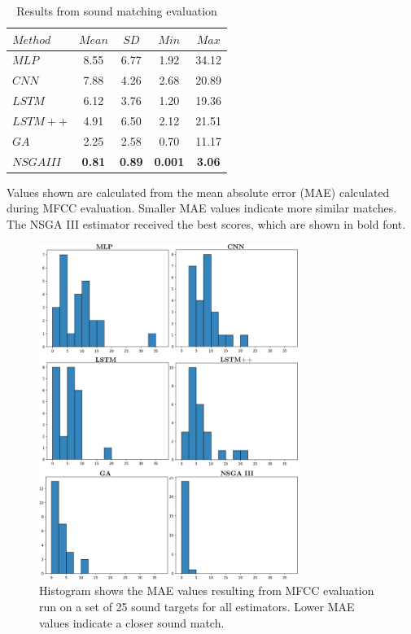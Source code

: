 \begin{table}[t]
\centering
\caption{Results from sound matching evaluation}
\label{tbl:sound_match_eval}
\begin{threeparttable}
\begin{tabular}{l|cccc}
\toprule
$Method$ & $Mean$ & $SD$ & $Min$ & $Max$ \\
\midrule
$MLP$ & 8.55 & 6.77 & 1.92 & 34.12 \\
$CNN$ & 7.88 & 4.26 & 2.68 & 20.89 \\
$LSTM$ & 6.12 & 3.76 & 1.20 & 19.36 \\
$LSTM++$ & 4.91 & 6.50 & 2.12 & 21.51 \\
$GA$ & 2.25 & 2.58 & 0.70 & 11.17 \\
$NSGA III$ & \textbf{0.81} & \textbf{0.89} & \textbf{0.001} & \textbf{3.06} \\
\bottomrule
\end{tabular}
\begin{tablenotes}
\footnotesize
\item Values shown are calculated from the mean absolute error (MAE) calculated during MFCC evaluation. Smaller MAE values indicate more similar matches. The NSGA III estimator received the best scores, which are shown in bold font.
\end{tablenotes}
\end{threeparttable}
\end{table}

\begin{figure}[t]
\begin{center}
\includegraphics[width=0.75\textwidth]{hist_group_v3.png}
\caption{Histogram shows the MAE values resulting from MFCC evaluation run on a set of 25 sound targets for all estimators. Lower MAE values indicate a closer sound match.}
\label{fig:group_hist}
\end{center}
\end{figure}

